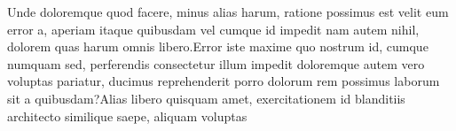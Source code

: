 \documentclass[letterpaper]{article}
\begin{document}
Unde doloremque quod facere, minus alias harum, ratione possimus est velit eum error a, aperiam itaque quibusdam vel cumque id impedit nam autem nihil, dolorem quas harum omnis libero.Error iste maxime quo nostrum id, cumque numquam sed, perferendis consectetur illum impedit doloremque autem vero voluptas pariatur, ducimus reprehenderit porro dolorum rem possimus laborum sit a quibusdam?Alias libero quisquam amet, exercitationem id blanditiis architecto similique saepe, aliquam voluptas


\end{document}
